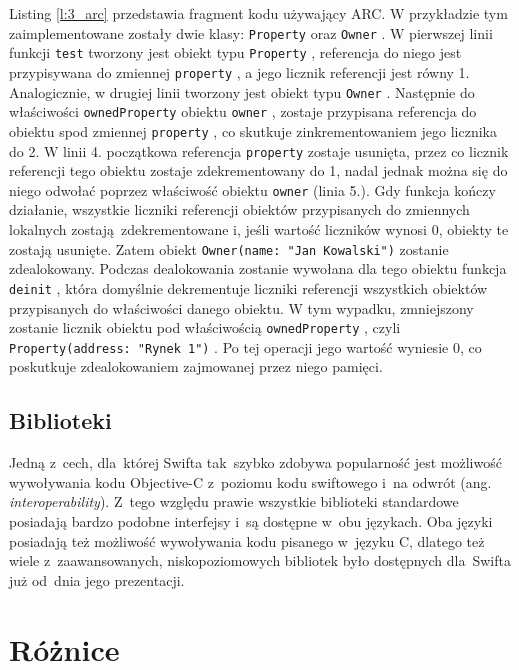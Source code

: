 \documentclass[mgr, shortabstract]{iithesis}
\newcommand{\ang}[1]{ang. \textit{#1}}
\newcommand{\swiftinline}[1]{
    \texttt{#1}
}
\begin{document}
Listing \ref{l:3_arc} przedstawia fragment kodu używający ARC. W przykładzie tym zaimplementowane zostały dwie klasy: \swiftinline{Property} oraz \swiftinline{Owner}. W pierwszej linii funkcji \swiftinline{test} tworzony jest obiekt typu \swiftinline{Property}, referencja do niego jest przypisywana do zmiennej \swiftinline{property}, a jego licznik referencji jest równy 1. Analogicznie, w drugiej linii tworzony jest obiekt typu \swiftinline{Owner}. Następnie do właściwości \swiftinline{ownedProperty} obiektu \swiftinline{owner}, zostaje przypisana referencja do obiektu spod zmiennej \swiftinline{property}, co skutkuje zinkrementowaniem jego licznika do 2. W linii 4. początkowa referencja \swiftinline{property} zostaje usunięta, przez co licznik referencji tego obiektu zostaje zdekrementowany do 1, nadal jednak można się do niego odwołać poprzez właściwość obiektu \swiftinline{owner} (linia 5.). Gdy funkcja kończy działanie, wszystkie liczniki referencji obiektów przypisanych do zmiennych lokalnych zostają zdekrementowane i, jeśli wartość liczników wynosi 0, obiekty te zostają usunięte. Zatem obiekt \swiftinline{Owner(name: "Jan Kowalski")} zostanie zdealokowany. Podczas dealokowania zostanie wywołana dla tego obiektu funkcja \swiftinline{deinit}, która domyślnie dekrementuje liczniki referencji wszystkich obiektów przypisanych do właściwości danego obiektu. W tym wypadku, zmniejszony zostanie licznik obiektu pod właściwością \swiftinline{ownedProperty}, czyli \swiftinline{Property(address: "Rynek 1")}. Po tej operacji jego wartość wyniesie 0, co poskutkuje zdealokowaniem zajmowanej przez niego pamięci.

\subsection{Biblioteki}

Jedną z~cech, dla~której Swifta tak~szybko zdobywa popularność jest możliwość wywoływania kodu Objective-C z~poziomu kodu swiftowego i~na odwrót (\ang{interoperability}). Z~tego względu prawie wszystkie biblioteki standardowe posiadają bardzo podobne interfejsy i~są dostępne w~obu językach. Oba języki posiadają też możliwość wywoływania kodu pisanego w~języku C, dlatego też wiele z~zaawansowanych, niskopoziomowych bibliotek było dostępnych dla~Swifta już od~dnia jego prezentacji.

\section{Różnice}
\end{document}
